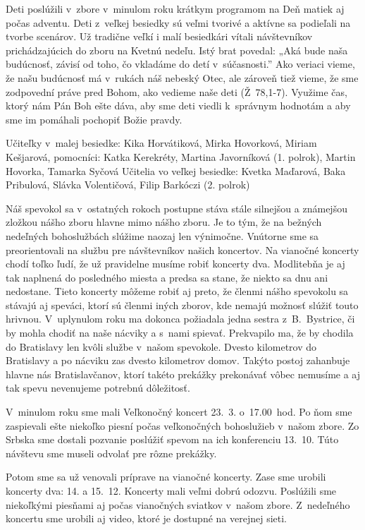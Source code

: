 Deti poslúžili v~zbore v~minulom roku krátkym programom na Deň matiek aj počas adventu. Deti z~veľkej besiedky sú veľmi tvorivé a aktívne sa podieľali na tvorbe scenárov. Už tradične veľkí i malí besiedkári vítali návštevníkov prichádzajúcich do zboru na Kvetnú nedeľu.
Istý brat povedal: „Aká bude naša budúcnosť, závisí od toho, čo vkladáme do detí v~súčasnosti.” Ako veriaci vieme, že našu budúcnosť má v~rukách náš nebeský Otec, ale zároveň tiež vieme, že sme zodpovední práve pred Bohom, ako vedieme naše deti \hbox{(Ž~78,1-7)}. Využime čas, ktorý nám Pán Boh ešte dáva, aby sme deti viedli k~správnym hodnotám a aby sme im pomáhali pochopiť Božie pravdy.

Učiteľky v~malej besiedke: Kika Horvátiková, Mirka Hovorková, Miriam Kešjarová, pomocníci: Katka Kerekréty, Martina Javorníková (1. polrok), Martin Hovorka, Tamarka Syčová
Učitelia vo veľkej besiedke: Kvetka Maďarová, Baka Pribulová, Slávka Volentičová, Filip Barkóczi (2. polrok)




Náš spevokol sa v~ostatných rokoch postupne stáva stále silnejšou a známejšou zložkou nášho zboru hlavne mimo nášho zboru. Je to tým, že na bežných nedeľných bohoslužbách slúžime naozaj len výnimočne. Vnútorne sme sa preorientovali na službu pre návštevníkov našich koncertov. Na vianočné koncerty chodí toľko ľudí, že už pravidelne musíme robiť koncerty dva. Modlitebňa je aj tak naplnená do posledného miesta a predsa sa stane, že niekto sa dnu ani nedostane. Tieto koncerty môžeme robiť aj preto, že členmi nášho spevokolu sa stávajú aj speváci, ktorí sú členmi iných zborov, kde nemajú možnosť slúžiť touto hrivnou. V~uplynulom roku ma dokonca požiadala jedna sestra z~B.~Bystrice, či by mohla chodiť na naše nácviky a s~nami spievať. Prekvapilo ma, že by chodila do Bratislavy len kvôli službe v~našom spevokole. Dvesto kilometrov do Bratislavy a po nácviku zas dvesto kilometrov domov. Takýto postoj zahanbuje hlavne nás Bratislavčanov, ktorí takéto prekážky prekonávať vôbec nemusíme a aj tak spevu nevenujeme potrebnú dôležitosť.

V~minulom roku sme mali Veľkonočný koncert 23.~3. o~17.00~hod. Po ňom sme zaspievali ešte niekoľko piesní počas veľkonočných bohoslužieb v~našom zbore. Zo Srbska sme dostali pozvanie poslúžiť spevom na ich konferenciu 13.~10. Túto návštevu sme museli odvolať pre rôzne prekážky.

Potom sme sa už venovali príprave na vianočné koncerty. Zase sme urobili koncerty dva: 14. a 15.~12. Koncerty mali veľmi dobrú odozvu. Poslúžili sme niekoľkými piesňami aj počas vianočných sviatkov v~našom zbore. Z~nedeľného koncertu sme urobili aj video, ktoré je dostupné na verejnej sieti.

